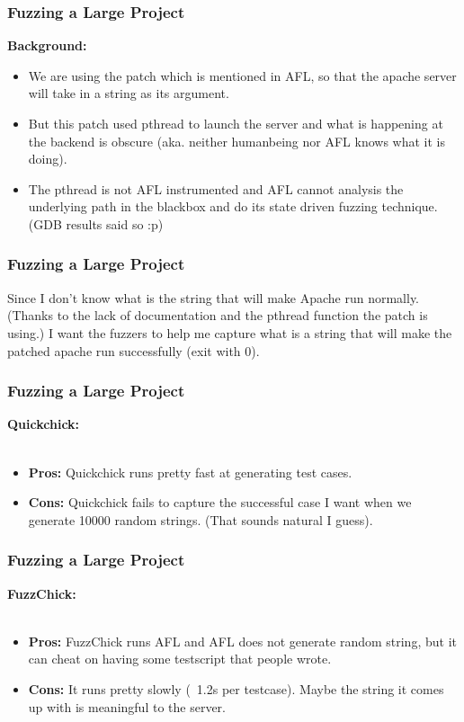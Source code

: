 \documentclass{beamer}
\begin{document}
\begin{frame}
\frametitle{Fuzzing a Large Project}

\textbf{Background:}
  \begin{itemize}
  \item We are using the patch which is mentioned in AFL, so that the apache server will take in a string as its argument.
    \pause{}
  \item But this patch used pthread to launch the server and what is happening at the backend is obscure (aka. neither humanbeing nor AFL knows what it is doing).
    \pause{}
  \item The pthread is not AFL instrumented and AFL cannot analysis the underlying path in the blackbox and do its state driven fuzzing technique. (GDB results said so :p)
  \end{itemize}


\end{frame}

\begin{frame}
\frametitle{Fuzzing a Large Project}

Since I don't know what is the string that will make Apache run normally.
(Thanks to the lack of documentation and the pthread function the patch is using.)
I want the fuzzers to help me capture what is a string that will make the patched apache run successfully (exit with 0).
    
\end{frame}

\begin{frame}
\frametitle{Fuzzing a Large Project}

\textbf{Quickchick:} \\~\\

\begin{itemize}
    \item \textbf{Pros:} Quickchick runs pretty fast at generating test cases.
    
    \item \textbf{Cons:} Quickchick fails to capture the successful case I want when we generate 10000 random strings. (That sounds natural I guess).
\end{itemize}

\end{frame}

\begin{frame}
\frametitle{Fuzzing a Large Project}
\textbf{FuzzChick:} \\~\\

\begin{itemize}
    \item \textbf{Pros:} FuzzChick runs AFL and AFL does not generate random string, but it can cheat on having some testscript that people wrote.
    
    \item \textbf{Cons:} It runs pretty slowly (~1.2s per testcase). Maybe the string it comes up with is meaningful to the server.
\end{itemize}

\end{frame}
\end{document}
